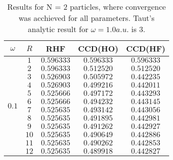 \documentclass[
    a4paper, aps, twocolumn, floatfix, superscriptaddress,
    nofootinbib]{revtex4-1}
\newcommand{\1}{\mathds{1}}
\begin{document}
    \begin{table}
        \centering
        \caption{Results for N = 2 particles, where convergence was 
            acchieved for all parameters. Taut's\cite{taut1994two}
            analytic result for $\omega=1.0a.u.$ is $3$.}
        \begin{ruledtabular}
            \begin{tabular}{c|c|ccc}
                $\omega$ & $R$ & RHF & CCD(HO) & CCD(HF) \\
                \hline
                           &  $1$  & $0.596333$ & $0.596333$ & $0.596333$ \\
                           &  $2$  & $0.596333$ & $0.512520$ & $0.512520$ \\
                           &  $3$  & $0.526903$ & $0.505972$ & $0.442235$ \\
                           &  $4$  & $0.526903$ & $0.499216$ & $0.442011$ \\
                           &  $5$  & $0.525666$ & $0.497172$ & $0.443293$ \\
    \multirow{2}{*}{$0.1$} &  $6$  & $0.525666$ & $0.494232$ & $0.443145$ \\
                           &  $7$  & $0.525635$ & $0.493142$ & $0.443056$ \\
                           &  $8$  & $0.525635$ & $0.491895$ & $0.442981$ \\
                           &  $9$  & $0.525635$ & $0.491262$ & $0.442927$ \\
                           &  $10$ & $0.525635$ & $0.490649$ & $0.442886$ \\
                           &  $11$ & $0.525635$ & $0.490262$ & $0.442853$ \\
                           &  $12$ & $0.525635$ & $0.489918$ & $0.442827$ \\
                \hline


\end{tabular}
\end{ruledtabular}
\end{table}
\end{document}
